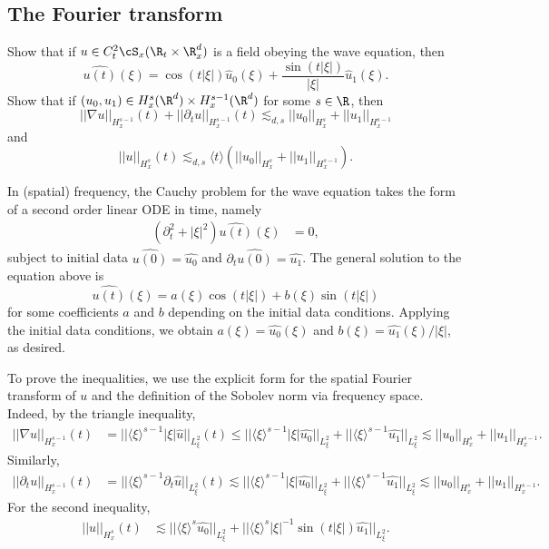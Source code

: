 \subsection{The Fourier transform}

\begin{statement}
	Show that if $u \in C^2_t \cS_x (\R_t \times \R^d_x)$ is a field obeying the wave equation, then
		\[ \widehat{u(t)} (\xi) = \cos(t |\xi|) \widehat u_0 (\xi) + \frac{\sin(t |\xi|)}{|\xi|} \widehat u_1 (\xi). \]	
	Show that if $(u_0, u_1) \in H^s_x (\R^d) \times H^{s- 1}_x (\R^d)$ for some $s \in \R$, then 
		\[ ||\nabla u||_{H^{s - 1}_x} (t) + ||\partial_t u||_{H^{s - 1}_x} (t) \lesssim_{d, s} ||u_0||_{H^s_x} + ||u_1||_{H^{s - 1}_x} \]
	and
		\[ ||u||_{H^s_x} (t) \lesssim_{d, s} \langle t \rangle \left( ||u_0||_{H^s_x} + ||u_1||_{H^{s - 1}_x} \right). \]	
\end{statement}

\begin{solution}
	In (spatial) frequency, the Cauchy problem for the wave equation takes the form of a second order linear ODE in time, namely
		\begin{align*} 
			(\partial_t^2 + |\xi|^2) \widehat{u(t)} (\xi) 
				&= 0, 
		\end{align*}	
	subject to initial data $\widehat{u(0)} = \widehat{u_0}$ and $\partial_t \widehat{u(0)} = \widehat{u_1}$. The general solution to the equation above is
		\[ \widehat{u(t)} (\xi) = a(\xi) \cos(t |\xi|) + b(\xi) \sin(t|\xi|)  \]
	for some coefficients $a$ and $b$ depending on the initial data conditions. Applying the initial data conditions, we obtain $a(\xi) = \widehat{u_0} (\xi)$ and $b(\xi) = \widehat{u_1} (\xi)/|\xi|$, as desired. 
	
	To prove the inequalities, we use the explicit form for the spatial Fourier transform of $u$ and the definition of the Sobolev norm via frequency space. Indeed, by the triangle inequality, 
		\begin{align*}
			||\nabla u||_{H^{s - 1}_x} (t)
				&= || \langle \xi \rangle^{s - 1} |\xi| \widehat u ||_{L^2_\xi} (t) \leq || \langle \xi \rangle^{s - 1} |\xi| \widehat{u_0} ||_{L^2_\xi} + || \langle \xi \rangle^{s - 1} \widehat{u_1} ||_{L^2_\xi}  \lesssim ||u_0||_{H^s_x} + ||u_1||_{H^{s - 1}_x}.
		\end{align*}
	Similarly, 
		\begin{align*}
			||\partial_t u||_{H^{s - 1}_x} (t)
				&= || \langle \xi \rangle^{s - 1} \partial_t \widehat u ||_{L^2_\xi} (t)
				\lesssim || \langle \xi \rangle^{s - 1} |\xi| \widehat{u_0} ||_{L^2_\xi} + ||\langle \xi \rangle^{s - 1} \widehat{u_1} ||_{L^2_\xi} \lesssim ||u_0||_{H^s_x} + ||u_1||_{H^{s - 1}_x}.
		\end{align*}	
	For the second inequality, 
		\begin{align*}
			||u||_{H^s_x} (t)
				&\lesssim ||\langle \xi \rangle^s \widehat{u_0} ||_{L^2_\xi} + ||  \langle \xi \rangle^s |\xi|^{-1}\sin(t |\xi|) \widehat{u_1}  ||_{L^2_\xi}.
		\end{align*}	
\end{solution}

